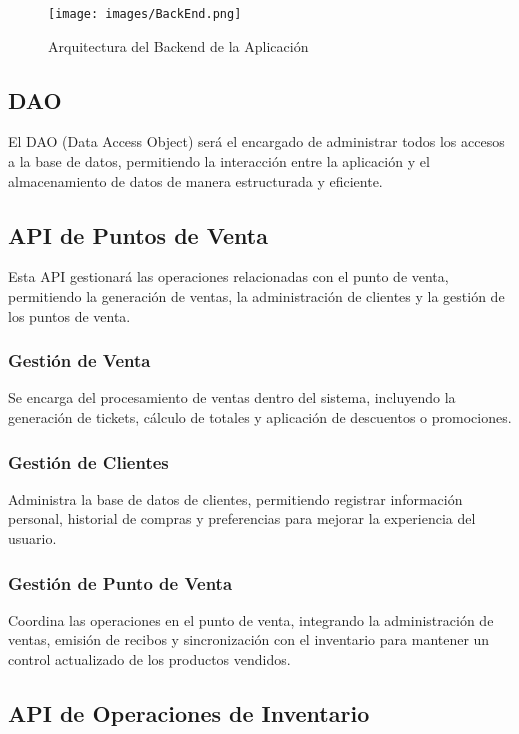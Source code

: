 \begin{figure}[H]
    \texttt{[image: images/BackEnd.png]}
    \centering
    \caption{Arquitectura del Backend de la Aplicación}
\end{figure}

\subsection{DAO}

El DAO (Data Access Object) será el encargado de administrar todos los accesos a la base de datos, permitiendo la 
interacción entre la aplicación y el almacenamiento de datos de manera estructurada y eficiente.

\subsection{API de Puntos de Venta}

Esta API gestionará las operaciones relacionadas con el punto de venta, permitiendo la generación de ventas, la administración 
de clientes y la gestión de los puntos de venta.

\subsubsection{Gestión de Venta}

Se encarga del procesamiento de ventas dentro del sistema, incluyendo la generación de tickets, 
cálculo de totales y aplicación de descuentos o promociones.

\subsubsection{Gestión de Clientes}

Administra la base de datos de clientes, permitiendo registrar información personal, historial de 
compras y preferencias para mejorar la experiencia del usuario.

\subsubsection{Gestión de Punto de Venta}

Coordina las operaciones en el punto de venta, integrando la administración de ventas, emisión de 
recibos y sincronización con el inventario para mantener un control actualizado de los productos vendidos.

\subsection{API de Operaciones de Inventario}

